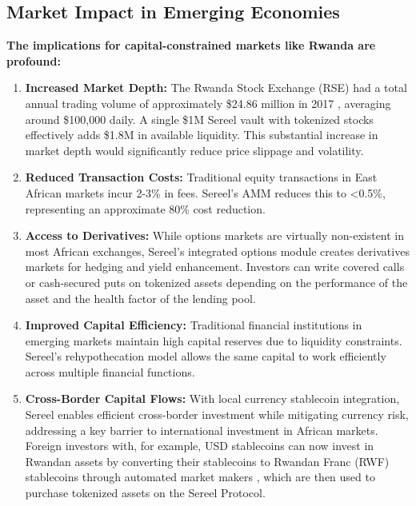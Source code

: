 \documentclass[12pt]{article}
\begin{document}
\subsection{Market Impact in Emerging Economies}
\textbf{The implications for capital-constrained markets like Rwanda are profound:}

\begin{enumerate}
    \item \textbf{Increased Market Depth:} The Rwanda Stock Exchange (RSE) had a total annual trading volume of approximately \$24.86 million in 2017 \citep{rse2017stats}, averaging around \$100,000 daily. A single \$1M Sereel vault with tokenized stocks effectively adds \$1.8M in available liquidity. This substantial increase in market depth would significantly reduce price slippage and volatility.
  
  \item \textbf{Reduced Transaction Costs:} Traditional equity transactions in East African markets incur 2-3\% in fees. Sereel's AMM reduces this to \textless 0.5\%, representing an approximate 80\% cost reduction.

  \item \textbf{Access to Derivatives:} While options markets are virtually non-existent in most African exchanges, Sereel's integrated options module creates derivatives markets for hedging and yield enhancement. Investors can write covered calls or cash-secured puts on tokenized assets depending on the performance of the asset and the health factor of the lending pool.

  \item \textbf{Improved Capital Efficiency:} Traditional financial institutions in emerging markets maintain high capital reserves due to liquidity constraints. Sereel's rehypothecation model allows the same capital to work efficiently across multiple financial functions.
  
  \item \textbf{Cross-Border Capital Flows:} With local currency stablecoin integration, Sereel enables efficient cross-border investment while mitigating currency risk, addressing a key barrier to international investment in African markets. Foreign investors with, for example, USD stablecoins can now invest in Rwandan assets by converting their stablecoins to Rwandan Franc (RWF) stablecoins through automated market makers \citep{uniswap2024onchain}, which are then used to purchase tokenized assets on the Sereel Protocol.
\end{enumerate}
\end{document}
